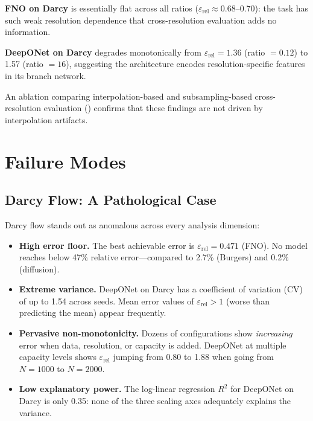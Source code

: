 \documentclass[11pt]{article}
\newcommand{\relLtwo}{\varepsilon_{\mathrm{rel}}}
\begin{document}
\textbf{FNO on Darcy} is essentially flat across all ratios
($\relLtwo \approx 0.68$--$0.70$): the task has such weak
resolution dependence that cross-resolution evaluation adds no
information.

\textbf{DeepONet on Darcy} degrades monotonically from
$\relLtwo = 1.36$ (ratio $= 0.12$) to 1.57 (ratio $= 16$),
suggesting the architecture encodes resolution-specific features
in its branch network.

An ablation comparing interpolation-based and subsampling-based
cross-resolution evaluation () confirms
that these findings are not driven by interpolation artifacts.


\section{Failure Modes}
\label{sec:failures}

\subsection{Darcy Flow: A Pathological Case}
\label{sec:darcy}

Darcy flow stands out as anomalous across every analysis dimension:

\begin{itemize}[leftmargin=*,itemsep=2pt]
  \item \textbf{High error floor.} The best achievable error is
    $\relLtwo = 0.471$ (FNO). No model reaches below 47\% relative
    error---compared to 2.7\% (Burgers) and 0.2\% (diffusion).

  \item \textbf{Extreme variance.} DeepONet on Darcy has a
    coefficient of variation (CV) of up to 1.54 across seeds. Mean
    error values of $\relLtwo > 1$ (worse than predicting the mean)
    appear frequently.

  \item \textbf{Pervasive non-monotonicity.} Dozens of configurations
    show \emph{increasing} error when data, resolution, or capacity
    is added. DeepONet at multiple capacity levels shows
    $\relLtwo$ jumping from 0.80 to 1.88 when going from $N = 1000$
    to $N = 2000$.

  \item \textbf{Low explanatory power.} The log-linear regression
    $R^2$ for DeepONet on Darcy is only 0.35: none of the three
    scaling axes adequately explains the variance.
\end{itemize}
\end{document}
